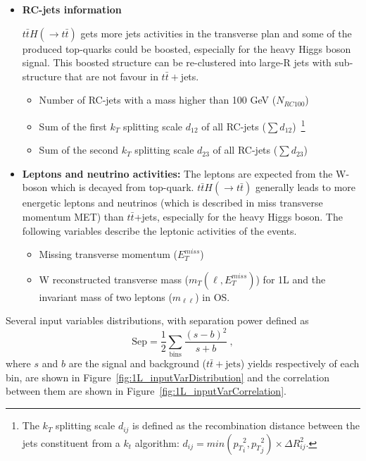 \begin{itemize}
\item \textbf{RC-jets information}

$t\bar{t}H(\rightarrow t\bar{t})$ gets more jets activities in the transverse plan and some of the produced top-quarks could be boosted, especially for the heavy Higgs boson signal.
This boosted structure can be re-clustered into large-R jets with sub-structure that are not favour in $t\bar{t}+$jets.

\begin{itemize}
\item Number of RC-jets with a mass higher than 100 GeV ($N_{RC100}$)
\item Sum of the first $k_{T}$ splitting scale $d_{12}$ of all RC-jets ($\sum d_{12}$)~\footnote{The $k_{T}$ splitting scale $d_{ij}$ is defined as the recombination distance between the jets constituent from a $k_{t}$ algorithm: $d_{ij}=min({p_{T}}_{i}^{2},{p_{T}}_{j}^{2})\times \Delta R^{2}_{ij}$.}
\item Sum of the second $k_{T}$ splitting scale $d_{23}$ of all RC-jets ($\sum d_{23}$)
\end{itemize}

\item \textbf{Leptons and neutrino activities:}
The leptons are expected from the W-boson which is decayed from top-quark.
$t\bar{t}H(\rightarrow t\bar{t})$ generally leads to more energetic leptons and neutrinos (which is described in miss transverse momentum MET) than $t\bar{t}$+jets, especially for the heavy Higgs boson.
The following variables describe the leptonic activities of the events.

\begin{itemize}
\item Missing transverse momentum ($E^{miss}_{T}$)
\item W reconstructed transverse mass ($m_{T}(\ell,E^{miss}_{T})$) for 1L and the invariant mass of two leptons ($m_{\ell \ell}$) in OS.
\end{itemize}

\end{itemize} 

Several input variables distributions, with separation power defined as
\begin{equation}
\mathrm{Sep}=\frac{1}{2}\sum_{\mathrm{bins}} \frac{(s-b)^{2}}{s+b}~,
\label{eqn:varSeparation}
\end{equation}
where $s$ and $b$ are the signal and background ($t\bar{t}+\mathrm{jets}$) yields respectively of each bin, are shown in Figure~\ref{fig:1L_inputVarDistribution} and the correlation between them are shown in Figure~\ref{fig:1L_inputVarCorrelation}.


